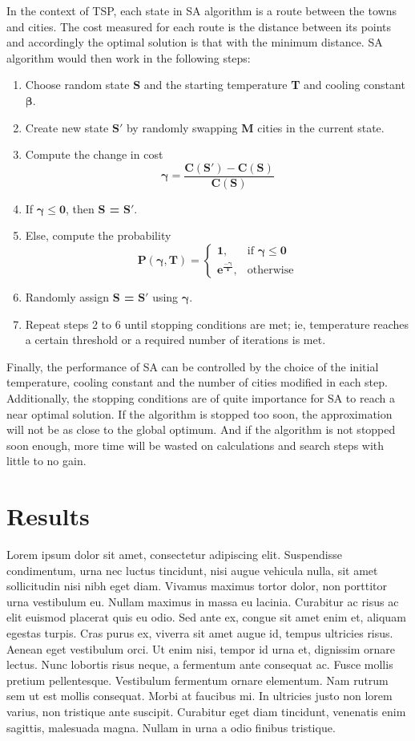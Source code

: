 \documentclass[twocolumn]{article}
\begin{document}
	 In the context of TSP, each state in SA algorithm is a route between the towns and cities. The cost measured for each route is the distance  between its points and accordingly the optimal solution is that with the minimum distance. SA algorithm would then work in the following steps:
	 \begin{enumerate}
	 	\item Choose random state {\bfseries S} and the starting temperature {\bfseries T} and cooling constant {$\boldsymbol \beta$}.
	 	\item Create new state $\boldsymbol{S\prime}$ by randomly swapping {\bfseries M} cities in the current state.
	 	\item Compute the change in cost \[
	 	\boldsymbol{\gamma = \dfrac{C(S')-C(S)}{C(S)}}
	 	\]
	 	\item If {$\boldsymbol{\gamma \leqslant 0}$, then {\bfseries S =} $\boldsymbol{S\prime}$.}
	 	\item Else, compute the probability \[
	 	\boldsymbol{P(\gamma, T)=}
	 	\begin{cases}
	 	\boldsymbol{1},& \text{if } \boldsymbol{\gamma\leqslant 0}\\
	 	\boldsymbol{e^{\frac{-\gamma}{T}}},& \text{otherwise}
	 	\end{cases} 
	 	\]
	 	\item Randomly assign {\bfseries S =} $\boldsymbol{S\prime}$ using {$\boldsymbol \gamma$}.
	 	\item Repeat steps 2 to 6 until stopping conditions are met; ie, temperature reaches a certain threshold or a required number of iterations is met.
	 \end{enumerate}
	 Finally, the performance of SA can be controlled by the choice of the initial temperature, cooling constant and the number of cities modified in each step. Additionally, the stopping conditions are of quite importance for SA to reach a near optimal solution. If the algorithm is stopped too soon, the approximation will not be as close to the global optimum. And if the algorithm is not stopped soon enough, more time will be wasted on calculations and search steps with little to no gain.
	\section{Results}
	
	
	Lorem ipsum dolor sit amet, consectetur adipiscing elit. Suspendisse condimentum, urna nec luctus tincidunt, nisi augue vehicula nulla, sit amet sollicitudin nisi nibh eget diam. Vivamus maximus tortor dolor, non porttitor urna vestibulum eu. Nullam maximus in massa eu lacinia. Curabitur ac risus ac elit euismod placerat quis eu odio. Sed ante ex, congue sit amet enim et, aliquam egestas turpis. Cras purus ex, viverra sit amet augue id, tempus ultricies risus. Aenean eget vestibulum orci. Ut enim nisi, tempor id urna et, dignissim ornare lectus. Nunc lobortis risus neque, a fermentum ante consequat ac. Fusce mollis pretium pellentesque. Vestibulum fermentum ornare elementum. Nam rutrum sem ut est mollis consequat. Morbi at faucibus mi. In ultricies justo non lorem varius, non tristique ante suscipit. Curabitur eget diam tincidunt, venenatis enim sagittis, malesuada magna. Nullam in urna a odio finibus tristique.
	
\end{document}
